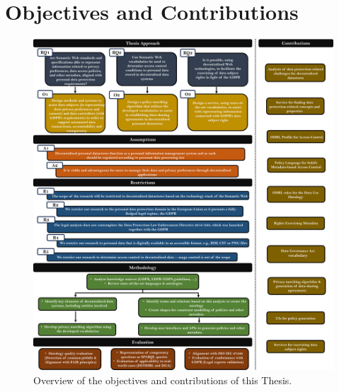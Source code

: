 \chapter{Objectives and Contributions}
\label{chap:objectives}

\begin{figure}[p]
    \centering
    \includegraphics[width=1.1\linewidth]{figures/chapter-3/rqs_objs_diagram.png}
    \caption{Overview of the objectives and contributions of this Thesis.}
    \label{fig:objectives}
\end{figure}








